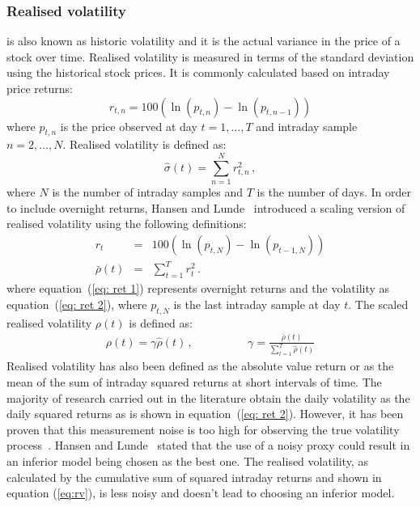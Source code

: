 \subsubsection{Realised volatility} is also known as historic volatility and
it is the actual variance in the price of a stock over time.
Realised volatility is measured in terms of the standard deviation
using the historical stock prices. It is commonly calculated based on
intraday price returns:
\begin{equation}
\label{eq:retintra}
r_{t,n}=100(\ln(p_{t,n}) - \ln(p_{t,n-1}))
\end{equation}
\noindent where $p_{t,n}$ is the price observed at day $t=1,\dots,T$ and
intraday sample $n=2,\dots,N$. Realised volatility is defined as:
\begin{equation}
\label{eq:rv}
    \hat{\sigma}(t) = \sum_{n=1}^N r_{t,n}^2 \, , 
\end{equation}
\noindent where $N$ is the number of intraday samples and $T$ is the
number of days. 
In order to include overnight returns, Hansen and
Lunde~\cite{hansen+lunde2005} introduced a scaling version of
realised volatility using the following definitions:
\begin{eqnarray}
r_{t}&=&100(\ln(p_{t,N}) - \ln(p_{t-1,N})) \label{eq: ret 1} \\
\bar{\rho}(t) &=& \sum_{t=1}^T r_{t}^2  \label{eq: ret 2} \, .
\end{eqnarray}
\noindent where equation~(\ref{eq: ret 1}) represents overnight 
returns and the volatility as 
equation~(\ref{eq: ret 2}), where $p_{t,N}$ is the last intraday 
sample at day $t$. The scaled realised volatility $\rho(t)$ is 
defined as:
\begin{eqnarray}
\label{eq:srv}
\rho(t) = \gamma \hat{\rho}(t) \, , \qquad & \qquad \gamma = \displaystyle \frac{\bar{\rho}(t)}{\displaystyle\sum_{t=1}^T \hat{\rho}(t)}
\end{eqnarray}
Realised volatility has also been defined as the absolute value return or as
the mean of the sum of intraday squared returns at short intervals of time. The
majority of research carried out in the literature obtain the daily volatility
as the daily squared returns as is shown in equation~(\ref{eq: ret 2}).
However, it has been proven that this measurement noise is too high for
observing the true volatility process~\cite{andersen+bollerslev1998}. Hansen
and Lunde~\cite{hansen+lunde2006} stated that the use of a noisy proxy could
result in an inferior model being chosen as the best one. The realised
volatility, as calculated by the cumulative sum of squared intraday returns and
shown in equation (\ref{eq:rv}), is less noisy and doesn't lead to choosing an
inferior model.   
